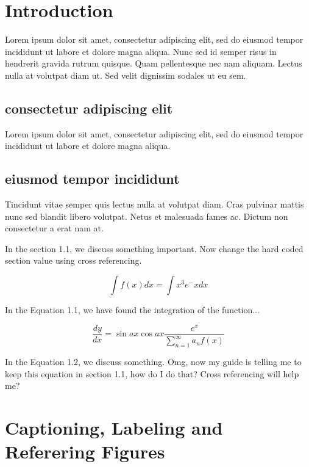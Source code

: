 \documentclass[oneside, 10pt]{book}
\begin{document}
\chapter{Introduction}
Lorem ipsum dolor sit amet, consectetur adipiscing elit, sed do eiusmod tempor incididunt ut labore et dolore magna aliqua. Nunc sed id semper risus in hendrerit gravida rutrum quisque. Quam pellentesque nec nam aliquam. Lectus nulla at volutpat diam ut. Sed velit dignissim sodales ut eu sem.

\section{consectetur adipiscing elit}

Lorem ipsum dolor sit amet, consectetur adipiscing elit, sed do eiusmod tempor incididunt ut labore et dolore magna aliqua. 


\section{ eiusmod tempor incididunt}
Tincidunt vitae semper quis lectus nulla at volutpat diam. Cras pulvinar mattis nunc sed blandit libero volutpat. Netus et malesuada fames ac. Dictum non consectetur a erat nam at. 

In the section 1.1, we discuss something important. Now change the hard coded section value using cross referencing. 

\begin{equation}
\int f(x) dx  = \int x^3e^-{x} dx  
\end{equation}

In the Equation 1.1, we have found the integration of the function...


\begin{equation}
\frac{dy}{dx} = \sin ax \cos ax \frac{e^x}{\sum_{n=1}^{\infty} a_n f(x)}
\end{equation}

In the Equation 1.2, we discuss something. Omg, now my guide is telling me to keep this equation in section 1.1, how do I do that? Cross referencing will help me?


\chapter{Captioning, Labeling and Referering Figures}
\end{document}
